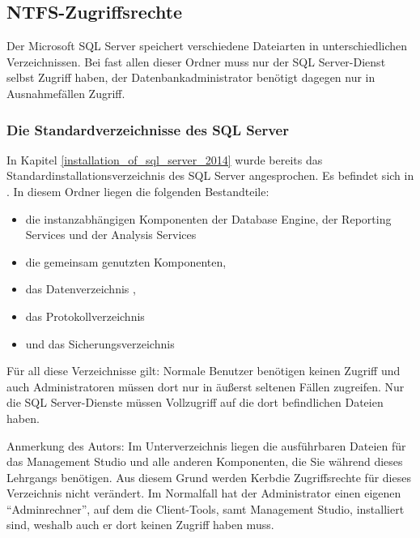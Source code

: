      \subsection{NTFS-Zugriffsrechte}
        Der Microsoft SQL Server speichert verschiedene Dateiarten in
        unterschiedlichen Verzeichnissen. Bei fast allen dieser Ordner muss nur
        der SQL Server-Dienst selbst Zugriff haben, der Datenbankadministrator
        benötigt dagegen nur in Ausnahmefällen Zugriff.
        \subsubsection{Die Standardverzeichnisse des SQL Server}
          In Kapitel \ref{installation_of_sql_server_2014} wurde bereits das
          Standardinstallationsverzeichnis des SQL Server angesprochen. Es
          befindet sich in . In diesem Ordner liegen die folgenden Bestandteile:
          \begin{itemize}
            \item die instanzabhängigen Komponenten der Database Engine, der
            Reporting Services und der Analysis Services
            \item die gemeinsam genutzten Komponenten,
            \item das Datenverzeichnis ,
            \item das Protokollverzeichnis 
            \item und das Sicherungsverzeichnis 
          \end{itemize}
          Für all diese Verzeichnisse gilt: Normale Benutzer benötigen keinen
          Zugriff und auch Administratoren müssen dort nur in äußerst seltenen
          Fällen zugreifen. Nur die SQL Server-Dienste müssen Vollzugriff auf
          die dort befindlichen Dateien haben.
          \begin{merke}
            Anmerkung des Autors: Im Unterverzeichnis  liegen
            die ausführbaren Dateien für das Management Studio und alle anderen
            Komponenten, die Sie während dieses Lehrgangs benötigen. Aus diesem
            Grund werden Kerbdie Zugriffsrechte für dieses Verzeichnis nicht
            verändert. Im Normalfall hat der Administrator einen eigenen
            \enquote{Adminrechner}, auf dem die Client-Tools, samt Management
            Studio, installiert sind, weshalb auch er dort keinen Zugriff haben
            muss.
          \end{merke}
